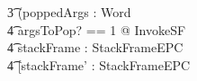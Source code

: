 \begin{figure}[tp!]
\begin{circusaction}
    \t3 (\circvar poppedArgs : \seq Word \circspot \\
    \t4 \lschexpract \exists argsToPop? == 1 @ InvokeSF \rschexpract \circseq \\
    \t4 \circvar stackFrame : StackFrameEPC \circspot \\
    \t4 \lschexpract [stackFrame' : StackFrameEPC \\

\end{circusaction}
\end{figure}
